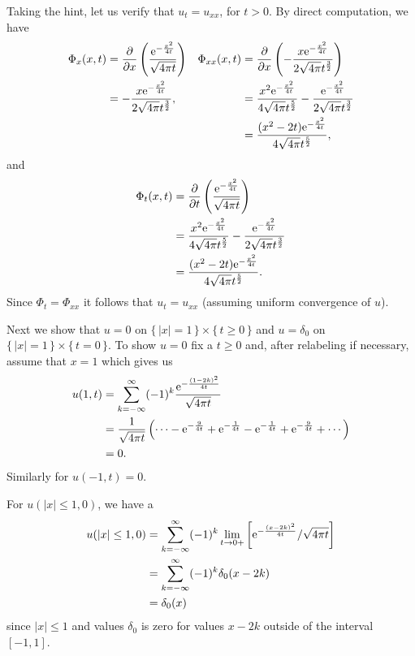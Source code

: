 \begin{solution}
  Taking the hint, let us verify that \(u_t=u_{xx}\), for \(t>0\). By
  direct computation, we have
  \begin{align*}
    \Phi_x(x,t)
    &=\frac{\partial}{\partial x}
      \left(\frac{\mathrm{e}^{-\frac{x^2}{4t}}}{\sqrt{4\pi t}}\right)
    &\Phi_{xx}(x,t)
    &=\frac{\partial}{\partial x}
      \left(-\frac{x\mathrm{e}^{-\frac{x^2}{4t}}}{2\sqrt{4\pi}t^{\frac{3}{2}}}\right)\\
    &=-\frac{x\mathrm{e}^{-\frac{x^2}{4t}}}{2\sqrt{4\pi}t^{\frac{3}{2}}},
    &&=\frac{x^2\mathrm{e}^{-\frac{x^2}{4t}}}{4\sqrt{4\pi}t^{\frac{5}{2}}}
      -\frac{\mathrm{e}^{-\frac{x^2}{4t}}}{2\sqrt{4\pi}t^{\frac{3}{2}}}
    \\
    &&&=\frac{(x^2-2t)\mathrm{e}^{-\frac{x^2}{4t}}}{4\sqrt{4\pi}t^{\frac{5}{2}}},
  \end{align*}
  and
  \begin{align*}
    \Phi_t(x,t)
    &=\frac{\partial}{\partial t}
      \left(\frac{\mathrm{e}^{-\frac{x^2}{4t}}}{\sqrt{4\pi t}}\right)\\
    &=\frac{x^2\mathrm{e}^{-\frac{x^2}{4t}}}{4\sqrt{4\pi}t^{\frac{5}{2}}}
      -\frac{\mathrm{e}^{-\frac{x^2}{4t}}}{2\sqrt{4\pi}t^{\frac{3}{2}}}\\
    &=\frac{(x^2-2t)\mathrm{e}^{-\frac{x^2}{4t}}}{4\sqrt{4\pi}t^{\frac{5}{2}}}.
  \end{align*}
  Since \(\Phi_t=\Phi_{xx}\) it follows that \(u_t=u_{xx}\) (assuming
  uniform convergence of \(u\)).

  Next we show that \(u=0\) on \(\{\,|x|=1\,\}\times\{\,t\geq 0\,\}\) and
  \(u=\delta_0\) on \(\{\,|x|=1\,\}\times\{\,t=0\,\}\). To show \(u=0\) fix
  a \(t\geq 0\) and, after relabeling if necessary, assume that \(x=1\)
  which gives us
  \begin{align*}
    u(1,t)
    &=\sum_{k=-\infty}^\infty(-1)^k\frac{\rme^{-\frac{(1-2k)^2}{4t}}}{\sqrt{4\pi
      t}}\\
    &=\frac{1}{\sqrt{4\pi t}}%
      \left(\dotsb-\rme^{-\frac{9}{4t}}%
      +\rme^{-\frac{1}{4t}}-\rme^{-\frac{1}{4t}}%
      +\rme^{-\frac{9}{4t}}+\dotsb\right)\\
    &=0.
  \end{align*}
  Similarly for \(u(-1,t)=0\).

  For \(u(|x|\leq 1,0)\), we have a
  \begin{align*}
    u(|x|\leq 1,0)
    &=\sum_{k=-\infty}^\infty(-1)^k\lim_{t\to 0+}
      \left[\mathrm{e}^{-\frac{(x-2k)^2}{4t}}/\sqrt{4\pi t}\right]\\
    &=\sum_{k=-\infty}^\infty(-1)^k\delta_0(x-2k)\\
    &=\delta_0(x)
  \end{align*}
  since \(|x|\leq 1\) and values \(\delta_0\) is zero for values \(x-2k\)
  outside of the interval \([-1,1]\).


\end{solution}
